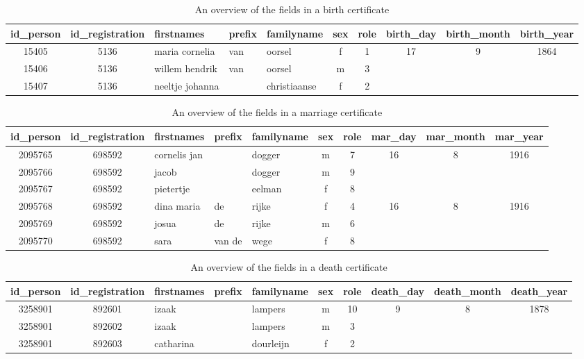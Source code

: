 \begin{landscape}
	\begin{table}
		\centering
		\caption[Overview of a birth-certificate]{An overview of the fields in a birth certificate}
		\begin{tabular}{@{}*2{c}*3{l}*5{c}@{}}
			\toprule
			id\_person & id\_registration & firstnames & prefix & familyname & sex & role & birth\_day & birth\_month & birth\_year \\
			\midrule
			15405 & 5136 & maria cornelia & van & oorsel & f & 1 & 17 & 9 & 1864\\
			15406 & 5136 & willem hendrik & van & oorsel & m & 3 &  &  & \\
			15407 & 5136 & neeltje johanna &  & christiaanse & f & 2 &  &  & \\
			\bottomrule
		\end{tabular}
		\label{tab:persons_record_overview_birth}
	\end{table}
	\begin{table}
		\centering
		\caption[Overview of a marriage-certificate]{An overview of the fields in a marriage certificate}
		\begin{tabular}{@{}*2{c}*3{l}*5{c}@{}}
			\toprule
			id\_person & id\_registration & firstnames & prefix & familyname & sex & role & mar\_day & mar\_month & mar\_year \\
			\midrule
			2095765 & 698592 & cornelis jan &  & dogger & m & 7 & 16 & 8 & 1916\\
			2095766 & 698592 & jacob &  & dogger & m & 9 &  &  & \\
			2095767 & 698592 & pietertje &  & eelman & f & 8 &  &  & \\
			2095768 & 698592 & dina maria & de & rijke & f & 4 & 16 & 8 & 1916\\
			2095769 & 698592 & josua & de & rijke & m & 6 &  &  & \\
			2095770 & 698592 & sara & van de & wege & f & 8 &  &  & \\
			\bottomrule
		\end{tabular}
		\label{tab:persons_record_overview_marriage}
	\end{table}
	\begin{table}
		\centering
		\caption[Overview of a death-certificate]{An overview of the fields in a death certificate}
		\begin{tabular}{@{}*2{c}*3{l}*5{c}@{}}
			\toprule
			id\_person & id\_registration & firstnames & prefix & familyname & sex & role & death\_day & death\_month & death\_year \\
			\midrule
			3258901 & 892601 & izaak &  & lampers & m & 10 & 9 & 8 & 1878\\
			3258901 & 892602 & izaak &  & lampers & m & 3 &  &  & \\
			3258901 & 892603 & catharina &  & dourleijn & f & 2 &  &  & \\
			\bottomrule
		\end{tabular}
		\label{tab:persons_record_overview_death}
	\end{table}
\end{landscape}

